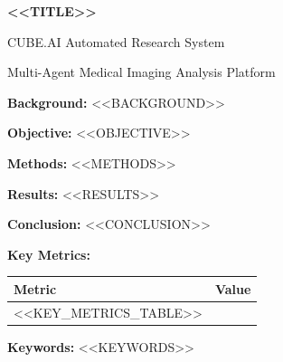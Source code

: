 \documentclass[11pt,a4paper]{article}
\begin{document}
\begin{center}
{\Large\bfseries <<TITLE>>}

\vspace{0.5em}
{\normalsize CUBE.AI Automated Research System}

\vspace{0.3em}
{\small Multi-Agent Medical Imaging Analysis Platform}

\vspace{1em}
\end{center}

\noindent\textbf{Background:} <<BACKGROUND>>

\vspace{0.5em}
\noindent\textbf{Objective:} <<OBJECTIVE>>

\vspace{0.5em}
\noindent\textbf{Methods:} <<METHODS>>

\vspace{0.5em}
\noindent\textbf{Results:} <<RESULTS>>

\vspace{0.5em}
\noindent\textbf{Conclusion:} <<CONCLUSION>>

\vspace{0.8em}
\noindent\textbf{Key Metrics:}

\vspace{0.3em}
\begin{center}
\begin{tabular}{ll}
\toprule
\textbf{Metric} & \textbf{Value} \\
\midrule
<<KEY_METRICS_TABLE>>
\bottomrule
\end{tabular}
\end{center}

\vspace{0.5em}
\noindent\textbf{Keywords:} <<KEYWORDS>>
\end{document}
